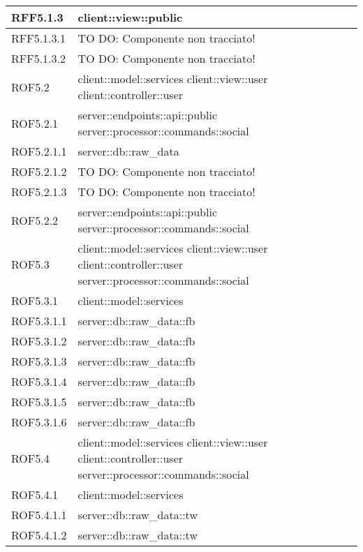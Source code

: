 \begin{center}
\begin{longtable}{| p{4cm} | p{8cm} |}
RFF5.1.3 & client::view::public \\
\hline
RFF5.1.3.1 & TO DO: Componente non tracciato! \\
\hline
RFF5.1.3.2 & TO DO: Componente non tracciato! \\
\hline
ROF5.2 & client::model::services \newline client::view::user \newline client::controller::user \\
\hline
ROF5.2.1 & server::endpoints::api::public \newline server::processor::commands::social \\
\hline
ROF5.2.1.1 & server::db::raw\_data \\
\hline
ROF5.2.1.2 & TO DO: Componente non tracciato! \\
\hline
ROF5.2.1.3 & TO DO: Componente non tracciato! \\
\hline
ROF5.2.2 & server::endpoints::api::public \newline server::processor::commands::social \\
\hline
ROF5.3 & client::model::services \newline client::view::user \newline client::controller::user \newline server::processor::commands::social \\
\hline
ROF5.3.1 & client::model::services \\
\hline
ROF5.3.1.1 & server::db::raw\_data::fb \\
\hline
ROF5.3.1.2 & server::db::raw\_data::fb \\
\hline
ROF5.3.1.3 & server::db::raw\_data::fb \\
\hline
ROF5.3.1.4 & server::db::raw\_data::fb \\
\hline
ROF5.3.1.5 & server::db::raw\_data::fb \\
\hline
ROF5.3.1.6 & server::db::raw\_data::fb \\
\hline
ROF5.4 & client::model::services \newline client::view::user \newline client::controller::user \newline server::processor::commands::social \\
\hline
ROF5.4.1 & client::model::services \\
\hline
ROF5.4.1.1 & server::db::raw\_data::tw \\
\hline
ROF5.4.1.2 & server::db::raw\_data::tw \\

\end{longtable}
\end{center}
